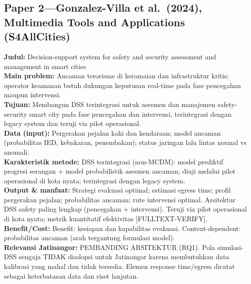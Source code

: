 \documentclass[a4paper,11pt]{article}
\begin{document}
\subsection*{Paper 2---Gonzalez-Villa et al.\ (2024), Multimedia Tools and Applications (S4AllCities)}
\textbf{Judul:} Decision-support system for safety and security assessment and management in smart cities\\
\textbf{Main problem:} Ancaman terorisme di keramaian dan infrastruktur kritis; operator keamanan butuh dukungan keputusan real-time pada fase pencegahan maupun intervensi.\\
\textbf{Tujuan:} Membangun DSS terintegrasi untuk asesmen dan manajemen safety-security smart city pada fase pencegahan dan intervensi, terintegrasi dengan legacy system dan teruji via pilot operasional.\\
\textbf{Data (input):} Pergerakan pejalan kaki dan kendaraan; model ancaman (probabilitas IED, kebakaran, penembakan); status jaringan lalu lintas normal vs anomali.\\
\textbf{Karakteristik metode:} DSS terintegrasi (non-MCDM): model prediktif progresi serangan + model probabilistik asesmen ancaman; diuji melalui pilot operasional di kota nyata; terintegrasi dengan legacy system.\\
\textbf{Output \& manfaat:} Strategi evakuasi optimal; estimasi egress time; profil pergerakan pejalan; probabilitas ancaman; rute intervensi optimal. Arsitektur DSS safety paling lengkap (pencegahan + intervensi). Teruji via pilot operasional di kota nyata; metrik kuantitatif efektivitas [FULLTEXT-VERIFY].\\
\textbf{Benefit/Cost:} Benefit: kesiapan dan kapabilitas evakuasi. Context-dependent: probabilitas ancaman (arah tergantung formulasi model).\\
\textbf{Relevansi Jatinangor:} PEMBANDING ARSITEKTUR (RQ1). Pola simulasi-DSS sengaja TIDAK diadopsi untuk Jatinangor karena membutuhkan data kalibrasi yang mahal dan tidak tersedia. Elemen response time/egress dicatat sebagai keterbatasan data dan riset lanjutan.
\end{document}
